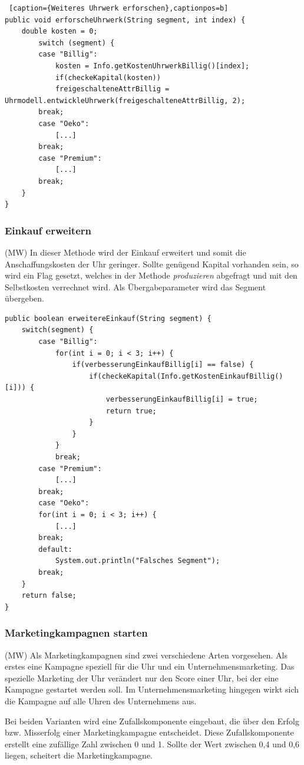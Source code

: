 \lstset{language=Java}
\begin{lstlisting} [caption={Weiteres Uhrwerk erforschen},captionpos=b]
public void erforscheUhrwerk(String segment, int index) {
	double kosten = 0;
		switch (segment) {
		case "Billig":
			kosten = Info.getKostenUhrwerkBillig()[index];
			if(checkeKapital(kosten))
			freigeschalteneAttrBillig = Uhrmodell.entwickleUhrwerk(freigeschalteneAttrBillig, 2);
		break;
		case "Oeko":
			[...]				
		break;
		case "Premium":
			[...]
		break;
	}	
}
\end{lstlisting}

\subsubsection{Einkauf erweitern}
(MW) In dieser Methode wird der Einkauf erweitert und somit die Anschaffungskosten der Uhr geringer. Sollte genügend Kapital vorhanden sein, so wird ein Flag gesetzt, welches in der Methode \textit{produzieren} abgefragt und mit den Selbstkosten verrechnet wird. Als Übergabeparameter wird das Segment übergeben.

\lstset{language=Java}
\begin{lstlisting}[caption={Einkauf erweitern},captionpos=b]
public boolean erweitereEinkauf(String segment) {
	switch(segment) {
		case "Billig":
			for(int i = 0; i < 3; i++) {
				if(verbesserungEinkaufBillig[i] == false) {
					if(checkeKapital(Info.getKostenEinkaufBillig()[i])) {
						verbesserungEinkaufBillig[i] = true;
						return true;
					}
				}
			}
			break;
		case "Premium":
			[...]
		break;
		case "Oeko":
		for(int i = 0; i < 3; i++) {
			[...]
		break;
		default:
			System.out.println("Falsches Segment");
		break;
	}
	return false;
}
\end{lstlisting}

\subsubsection{Marketingkampagnen starten}
(MW) Als Marketingkampagnen sind zwei verschiedene Arten vorgesehen. Als erstes eine Kampagne speziell für die Uhr und ein Unternehmensmarketing. Das spezielle Marketing der Uhr verändert nur den Score einer Uhr, bei der eine Kampagne gestartet werden soll. Im Unternehmensmarketing hingegen wirkt sich die Kampagne auf alle Uhren des Unternehmens aus.

Bei beiden Varianten wird eine Zufallskomponente eingebaut, die über den Erfolg bzw. Misserfolg einer Marketingkampagne entscheidet. Diese Zufallskomponente erstellt eine zufällige Zahl zwischen 0 und 1. Sollte der Wert zwischen 0,4 und 0,6 liegen, scheitert die Marketingkampagne.

